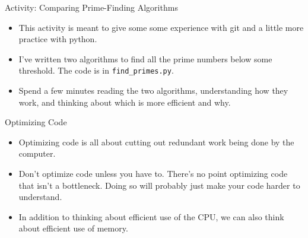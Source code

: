 \begin{frame}{Activity: Comparing Prime-Finding Algorithms}

 \begin{itemize}
   
  \item This activity is meant to give some some experience with git and a 
   little more practice with python.

  \item I've written two algorithms to find all the prime numbers below some 
  threshold.  The code is in \texttt{find\_primes.py}.

  \item Spend a few minutes reading the two algorithms, understanding how they 
   work, and thinking about which is more efficient and why.

 \end{itemize}

\end{frame}

\begin{frame}{Optimizing Code}

 \begin{itemize}

  \item Optimizing code is all about cutting out redundant work being done by 
   the computer.

  \item Don't optimize code unless you have to.  There's no point optimizing 
   code that isn't a bottleneck.  Doing so will probably just make your code 
   harder to understand.

  \item In addition to thinking about efficient use of the CPU, we can also 
   think about efficient use of memory.

 \end{itemize}

\end{frame}

